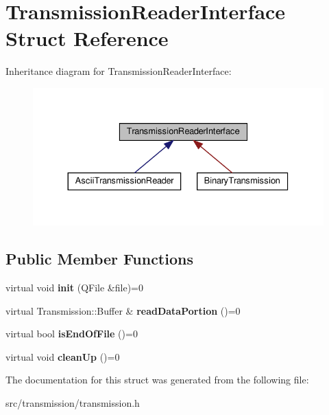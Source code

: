 \hypertarget{structTransmissionReaderInterface}{}\section{Transmission\+Reader\+Interface Struct Reference}
\label{structTransmissionReaderInterface}


Inheritance diagram for Transmission\+Reader\+Interface\+:
\nopagebreak
\begin{figure}[H]
\begin{center}
\leavevmode
\includegraphics[width=330pt]{structTransmissionReaderInterface__inherit__graph}
\end{center}
\end{figure}
\subsection*{Public Member Functions}
\begin{DoxyCompactItemize}
\item 
\mbox{\label{structTransmissionReaderInterface_af710542d346673dbb3eea75ebcbd4d13}} 
virtual void {\bfseries init} (Q\+File \&file)=0
\item 
\mbox{\label{structTransmissionReaderInterface_a563de3e903c5ee2bda350ef43cb79924}} 
virtual Transmission\+::\+Buffer \& {\bfseries read\+Data\+Portion} ()=0
\item 
\mbox{\label{structTransmissionReaderInterface_a9371da83c11435abd944d1e453af047a}} 
virtual bool {\bfseries is\+End\+Of\+File} ()=0
\item 
\mbox{\label{structTransmissionReaderInterface_adc3ecc4a3c623e3aac7477caab8afa7b}} 
virtual void {\bfseries clean\+Up} ()=0
\end{DoxyCompactItemize}


The documentation for this struct was generated from the following file\+:\begin{DoxyCompactItemize}
\item 
src/transmission/transmission.\+h\end{DoxyCompactItemize}
